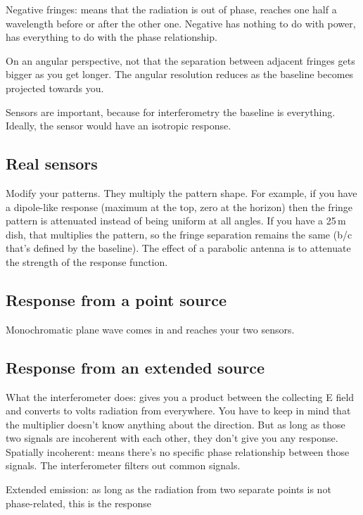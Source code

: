 \documentclass[a4paper]{article}
\begin{document}
Negative fringes: means that the radiation is out of phase, reaches one half a wavelength before or after the other one. Negative has nothing to do with power, has everything to do with the phase relationship. 

On an angular perspective, not that the separation between adjacent fringes gets bigger as you get longer. The angular resolution reduces as the baseline becomes projected towards you. 

Sensors are important, because for interferometry the baseline is everything. Ideally, the sensor would have an isotropic response. 

\subsection{Real sensors}

Modify your patterns. They multiply the pattern shape. For example, if you have a dipole-like response (maximum at the top, zero at the horizon) then the fringe pattern is attenuated instead of being uniform at all angles. If you have a 25\,m dish, that multiplies the pattern, so the fringe separation remains the same (b/c that's defined by the baseline). The effect of a parabolic antenna is to attenuate the strength of the response function. 

\subsection{Response from a point source}

Monochromatic plane wave comes in and reaches your two sensors.

\subsection{Response from an extended source}

What the interferometer does: gives you a product between the collecting E field and converts to volts radiation from everywhere. You have to keep in mind that the multiplier doesn't know anything about the direction. But as long as those two signals are incoherent with each other, they don't give you any response. Spatially incoherent: means there's no specific phase relationship between those signals. The interferometer filters out common signals. 

Extended emission: as long as the radiation from two separate points is not phase-related, this is the response
\end{document}
